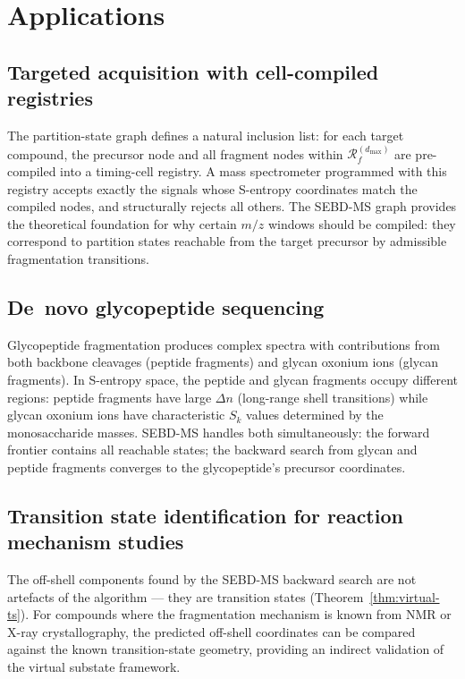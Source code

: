 \documentclass[twocolumn,10pt,a4paper]{article}
\theoremstyle{thmstyle}
\theoremstyle{definition}
\theoremstyle{remark}
\newcommand{\Sk}{S_{k}}
\newcommand{\Reachf}{\mathcal{R}_f}
\begin{document}
\section{Applications}
\label{sec:applications}

\subsection{Targeted acquisition with cell-compiled registries}

The partition-state graph defines a natural inclusion list: for each
target compound, the precursor node and all fragment nodes within
$\Reachf^{(d_\text{max})}$ are pre-compiled into a timing-cell registry.
A mass spectrometer programmed with this registry accepts exactly the
signals whose S-entropy coordinates match the compiled nodes, and
structurally rejects all others. The SEBD-MS graph provides the
theoretical foundation for why certain $m/z$ windows should be compiled:
they correspond to partition states reachable from the target precursor
by admissible fragmentation transitions.

\subsection{De~novo glycopeptide sequencing}

Glycopeptide fragmentation produces complex spectra with contributions
from both backbone cleavages (peptide fragments) and glycan oxonium
ions (glycan fragments). In S-entropy space, the peptide and glycan
fragments occupy different regions: peptide fragments have large $\Delta n$
(long-range shell transitions) while glycan oxonium ions have
characteristic $\Sk$ values determined by the monosaccharide masses.
SEBD-MS handles both simultaneously: the forward frontier contains all
reachable states; the backward search from glycan and peptide fragments
converges to the glycopeptide's precursor coordinates.

\subsection{Transition state identification for reaction mechanism studies}

The off-shell components found by the SEBD-MS backward search are
not artefacts of the algorithm --- they are transition states
(Theorem~\ref{thm:virtual-ts}). For compounds where the fragmentation
mechanism is known from NMR or X-ray crystallography, the predicted
off-shell coordinates can be compared against the known transition-state
geometry, providing an indirect validation of the virtual substate
framework.
\end{document}
